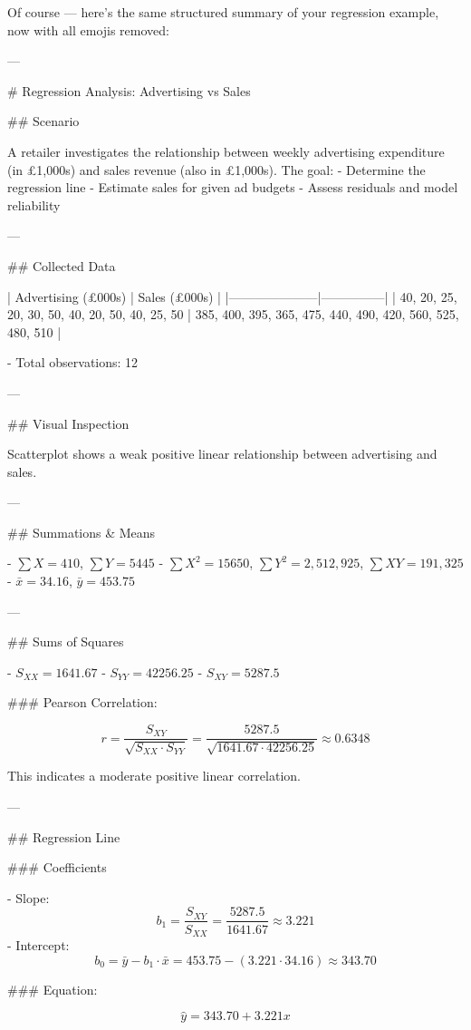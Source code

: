 Of course — here’s the same structured summary of your regression example, now with all emojis removed:

---

# Regression Analysis: Advertising vs Sales

## Scenario

A retailer investigates the relationship between weekly advertising expenditure (in £1,000s) and sales revenue (also in £1,000s). The goal:
- Determine the regression line  
- Estimate sales for given ad budgets  
- Assess residuals and model reliability

---

## Collected Data

| Advertising (£000s) | Sales (£000s) |
|---------------------|---------------|
| 40, 20, 25, 20, 30, 50, 40, 20, 50, 40, 25, 50 | 385, 400, 395, 365, 475, 440, 490, 420, 560, 525, 480, 510 |

- Total observations: 12

---

## Visual Inspection

Scatterplot shows a weak positive linear relationship between advertising and sales.

---

## Summations & Means

- \( \sum X = 410 \), \( \sum Y = 5445 \)  
- \( \sum X^2 = 15650 \), \( \sum Y^2 = 2,512,925 \), \( \sum XY = 191,325 \)
- \( \bar{x} = 34.16 \), \( \bar{y} = 453.75 \)

---

## Sums of Squares

- \( S_{XX} = 1641.67 \)  
- \( S_{YY} = 42256.25 \)  
- \( S_{XY} = 5287.5 \)

### Pearson Correlation:

\[
r = \frac{S_{XY}}{\sqrt{S_{XX} \cdot S_{YY}}}
= \frac{5287.5}{\sqrt{1641.67 \cdot 42256.25}}
≈ 0.6348
\]

This indicates a moderate positive linear correlation.

---

## Regression Line

### Coefficients

- Slope:  
  \[
  b_1 = \frac{S_{XY}}{S_{XX}} = \frac{5287.5}{1641.67} ≈ 3.221
  \]
- Intercept:  
  \[
  b_0 = \bar{y} - b_1 \cdot \bar{x} = 453.75 - (3.221 \cdot 34.16) ≈ 343.70
  \]

### Equation:

\[
\hat{y} = 343.70 + 3.221x
\]

